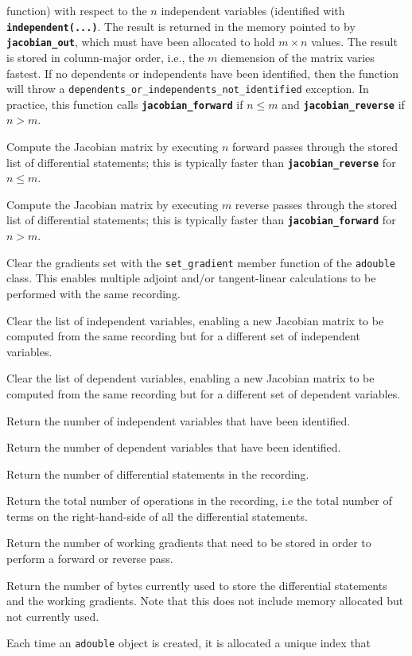 \documentclass[a4,oneside]{book}
\def\codesize{\small}
\def\code#1{{\codesize\texttt{#1}}}
\def\codebf#1{{\codesize\texttt{\textbf{#1}}}}
\def\citem#1{\item[{\codesize\texttt{#1}}]}
\def\Offset{size\_t}
\begin{document}
\begin{description}
function) with respect to the $n$ independent variables (identified
with \codebf{independent(...)}. The result is returned in the memory
pointed to by \codebf{jacobian\_out}, which must have been allocated
to hold $m\times n$ values. The result is stored in
column-major order, i.e., the $m$ diemension of the matrix varies
fastest. If no dependents or independents have been identified,
then the function will throw a
\code{dependents\_or\_independents\_not\_identified} exception. In
practice, this function calls \codebf{jacobian\_forward} if $n\le
m$ and \codebf{jacobian\_reverse} if $n>m$.
%
\citem{void jacobian\_forward(double* jacobian\_out)} Compute the Jacobian matrix by executing
$n$ forward passes through the stored list of differential statements;
this is typically faster than \codebf{jacobian\_reverse} for $n\le
m$.
%
\citem{void jacobian\_reverse(double* jacobian\_out)} Compute the Jacobian matrix by executing
$m$ reverse passes through the stored list of differential statements;
this is typically faster than \codebf{jacobian\_forward} for
$n>m$.
%
\citem{void clear\_gradients()} Clear the gradients set with the
\code{set\_gradient} member function of the \code{adouble} class. This
enables multiple adjoint and/or tangent-linear calculations to be
performed with the same recording.
%
\citem{void clear\_independents()} Clear the list of independent
variables, enabling a new Jacobian matrix to be computed from the same
recording but for a different set of independent variables.
%
\citem{void clear\_dependents()} Clear the list of dependent
variables, enabling a new Jacobian matrix to be computed from the same
recording but for a different set of dependent variables.
%
\citem{\Offset\ n\_independents()} Return the number of independent
variables that have been identified.
%
\citem{\Offset\ n\_dependents()} Return the number of dependent
variables that have been identified.
%
\citem{\Offset\ n\_statements()} Return the number of differential
statements in the recording.
%
\citem{\Offset\ n\_operations()} Return the total number of operations
in the recording, i.e the total number of terms on the right-hand-side
of all the differential statements.
%
\citem{\Offset\ max\_gradients()} Return the number of working gradients
that need to be stored in order to perform a forward or reverse pass.
%
\citem{size\_t memory()} Return the number of bytes currently
used to store the differential statements and the working
gradients. Note that this does not include memory allocated but not
currently used.
%
\citem{\Offset\ n\_gradients\_registered()} Each time an
\code{adouble} object is created, it is allocated a unique index that

\end{description}
\end{document}
